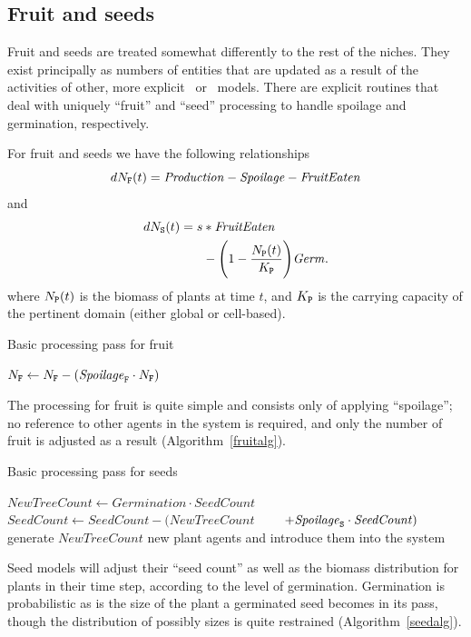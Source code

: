 
\subsection*{Fruit and seeds}
Fruit and seeds are treated somewhat differently to the rest of the
niches. They exist principally as numbers of entities that are updated
as a result of the activities of other, more explicit \SD\ or
\IB\ models.  There are explicit routines that deal with uniquely
``fruit'' and ``seed'' processing to handle spoilage and germination,
respectively.

For fruit and seeds we have the following relationships
\begin{equation*}
   dN_{\mathtt{F}}(t) = \mathit{Production} - \mathit{Spoilage} - \mathit{FruitEaten}
\end{equation*}
and
\begin{align*}
  dN_{\mathtt{S}}(t) = s &* \mathit{FruitEaten} \\
  &- \Biggl(1 - \frac{N_{\mathtt{P}}(t)}{K_{\mathtt{P}}}\Biggr)\mathit{Germ}.
\end{align*}
where $N_{\mathtt{P}}(t)$ is the biomass of plants at time $t$, and $K_{\mathtt{P}}$ is
the carrying capacity of the pertinent domain (either global or
cell-based).
\begin{algorithm}\label{fruitalg}
  \caption{Basic processing pass for fruit}
  \begin{algorithmic}
    \State $N_{\mathtt{F}} \gets N_{\mathtt{F}} - (\mathit{Spoilage}_{\mathtt{F}} \cdot N_{\mathtt{F}})$
  \end{algorithmic}
\end{algorithm}
The processing for fruit is quite simple and consists only of
applying ``spoilage''; no reference to other agents in
the system is required, and only the number of fruit is adjusted as a
result (Algorithm~\ref{fruitalg}).
\begin{algorithm}\label{seedalg}
  \caption{Basic processing pass for seeds}
  \begin{algorithmic}
    \State $\mathit{NewTreeCount} \gets \mathit{Germination} \cdot  \mathit{SeedCount}$
    \State $\mathit{SeedCount} \gets \mathit{SeedCount} -  (\mathit{NewTreeCount} $
    \State $\qquad + \mathit{Spoilage}_{\mathtt{S}} \cdot \mathit{SeedCount})$
    \State generate $NewTreeCount$ new plant agents and introduce them into the system
  \end{algorithmic}
\end{algorithm}
Seed models will adjust their ``seed count'' as well as the biomass
distribution for plants in their time step, according to the level of
germination. Germination is probabilistic as is the size of the plant
a germinated seed becomes in its pass, though the distribution of
possibly sizes is quite restrained (Algorithm~\ref{seedalg}).

